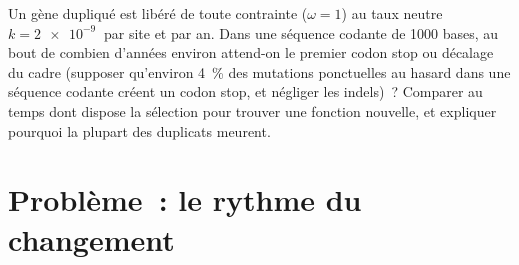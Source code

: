\begin{exercise}[$\star\star\star$]\label{exo:b3:molecular-evolution:12}
Un gène dupliqué est libéré de toute contrainte ($\omega = 1$) au taux
neutre $k = \qty{2e-9}{}$ par site et par an. Dans une séquence codante
de 1000 bases, au bout de combien d'années environ attend-on le premier
codon stop ou décalage du cadre (supposer qu'environ \qty{4}{\%} des
mutations ponctuelles au hasard dans une séquence codante créent un
codon stop, et négliger les indels)~? Comparer au temps dont dispose la
sélection pour trouver une fonction nouvelle, et expliquer pourquoi la
plupart des duplicats meurent.
\end{exercise}

\section{Problème~: le rythme du changement}

